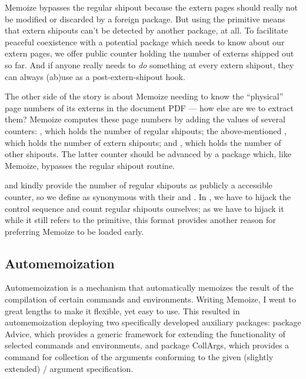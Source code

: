 \documentclass[a4paper,11pt]{article}
\begin{document}
Memoize bypasses the regular shipout because the extern pages should really not
be modified or discarded by a foreign package.  But using the primitive
 means that extern shipouts can't be detected by another
package, at all.  To facilitate peaceful coexistence with a potential package
which needs to know about our extern pages, we offer public counter
 holding the number of externs shipped out so far.  And
if anyone really needs to \emph{do} something at every extern shipout, they can
always (ab)use  as a
post-extern-shipout hook.

The other side of the story is about Memoize needing to know the ``physical''
page numbers of its externs in the document PDF --- how else are we to extract
them?  Memoize computes these page numbers by adding the values of several
counters: , which holds the number of regular shipouts;
the above-mentioned , which holds the number of extern
shipouts; and , which holds the number of other shipouts.
The latter counter should be advanced by a package which, like Memoize,
bypasses the regular shipout routine.

 and  kindly provide the number of regular
shipouts as publicly a accessible counter, so we define
 as synonymous with their
 and .  In , we
have to hijack the  control sequence and count regular shipouts
ourselves; as we have to hijack it while it still refers to the
 primitive, this format provides another reason for preferring
Memoize to be loaded early.


\subsection{Automemoization}
\label{sec:tut:automemoization-details}

Automemoization is a mechanism that automatically memoizes the result of the
compilation of certain commands and environments.  Writing Memoize, I went to
great lengths to make it flexible, yet easy to use.  This resulted in
automemoization deploying two specifically developed auxiliary packages:
package Advice, which provides a generic framework for extending the
functionality of selected commands and environments, and package CollArgs,
which provides a command for collection of the arguments conforming to the
given (slightly extended) \slash {} argument
specification.
\end{document}
